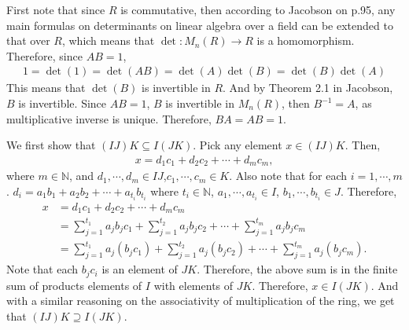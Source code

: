 \documentclass[12pt]{article}
\begin{document}
\begin{fproof}[Jacobson 2.3.2]
    First note that since \(R\) is commutative, then according to Jacobson on p.95, any main formulas on determinants on linear algebra over a field can be extended to that over \(R\), which means that \(\det: M_n(R) \to R\) is a homomorphism.
    Therefore, since \(AB = 1\), 
    \begin{align*}
        1 = \det(1)= \det(AB) = \det(A) \det(B) = \det(B)\det(A)
    \end{align*}
    This means that \(\det(B)\) is invertible in \(R\).
    And by Theorem 2.1 in Jacobson,
    \(B\) is invertible.
    Since \(AB = 1\), \(B\) is invertible in \(M_n(R)\), then \(B^{-1} = A\), as multiplicative inverse is unique.
    Therefore, \(BA = AB = 1\).
\end{fproof}
\newpage

\begin{fproof}[Jacobson 2.4.5]

\end{fproof}
\newpage

\begin{fproof}[Jacobson 2.5.2]
  We first show that \((IJ)K \subseteq I(JK)\).
  Pick any element \(x \in (IJ)K\).
  Then,
  \begin{align*}
    x = d_1c_1 + d_2c_2 + \cdots + d_{m}c_{m},
  \end{align*}
  where \(m \in \mathbb{N}\), and \(d_1, \cdots, d_{m} \in IJ\),\( c_1, \cdots, c_{m} \in K\).
  Also note that for each \(i = 1, \cdots, m\).
  \(d_i = a_1b_1 + a_2b_2 + \cdots + a_{t_i}b_{t_i}\) where \(t_i \in \mathbb{N}\), \(a_1, \cdots, a_{t_i} \in I\), \(b_1, \cdots, b_{t_i} \in J\).
  Therefore,
  \begin{align*}
    x &= d_1c_1 + d_2c_2 + \cdots + d_{m}c_{m}\\
    &= \sum_{j=1}^{t_1} a_jb_jc_1 + \sum_{j=1}^{t_2} a_jb_jc_2 + \cdots + \sum_{j=1}^{t_m} a_jb_jc_m\\
    &= \sum_{j=1}^{t_1} a_j(b_jc_1) + \sum_{j=1}^{t_2} a_j(b_jc_2) + \cdots + \sum_{j=1}^{t_m} a_j(b_jc_m).
  \end{align*}
  Note that each \(b_jc_i\) is an element of \(JK\).
  Therefore, the above sum is in the finite sum of products elements of \(I\) with elements of \(JK\).
  Therefore, \(x \in I(JK)\).
  And with a similar reasoning on the associativity of multiplication of the ring, we get that \((IJ)K \supseteq I(JK)\).
\end{fproof}
\newpage
\end{document}
